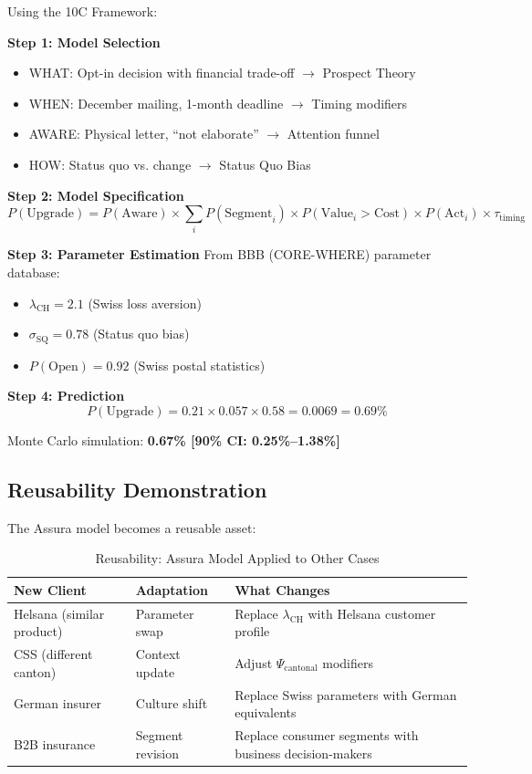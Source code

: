 Using the 10C Framework:

\textbf{Step 1: Model Selection}
\begin{itemize}[nosep]
    \item WHAT: Opt-in decision with financial trade-off $\to$ Prospect Theory
    \item WHEN: December mailing, 1-month deadline $\to$ Timing modifiers
    \item AWARE: Physical letter, ``not elaborate'' $\to$ Attention funnel
    \item HOW: Status quo vs. change $\to$ Status Quo Bias
\end{itemize}

\textbf{Step 2: Model Specification}
\begin{equation}
P(\text{Upgrade}) = P(\text{Aware}) \times \sum_i P(\text{Segment}_i) \times P(\text{Value}_i > \text{Cost}) \times P(\text{Act}_i) \times \tau_{\text{timing}}
\end{equation}

\textbf{Step 3: Parameter Estimation}
From BBB (CORE-WHERE) parameter database:
\begin{itemize}[nosep]
    \item $\lambda_{\text{CH}} = 2.1$ (Swiss loss aversion)
    \item $\sigma_{\text{SQ}} = 0.78$ (Status quo bias)
    \item $P(\text{Open}) = 0.92$ (Swiss postal statistics)
\end{itemize}

\textbf{Step 4: Prediction}
\begin{equation}
P(\text{Upgrade}) = 0.21 \times 0.057 \times 0.58 = 0.0069 = 0.69\%
\end{equation}

Monte Carlo simulation: \textbf{0.67\% [90\% CI: 0.25\%--1.38\%]}

\subsection{Reusability Demonstration}

The Assura model becomes a reusable asset:

\begin{table}[htbp]
\centering
\caption{Reusability: Assura Model Applied to Other Cases}
\label{tab:fm-reusability}
\renewcommand{\arraystretch}{1.3}
\begin{tabular}{@{}p{3.5cm}p{3cm}p{6cm}@{}}
\toprule
\textbf{New Client} & \textbf{Adaptation} & \textbf{What Changes} \\
\midrule
Helsana (similar product) & Parameter swap & Replace $\lambda_{\text{CH}}$ with Helsana customer profile \\
CSS (different canton) & Context update & Adjust $\Psi_{\text{cantonal}}$ modifiers \\
German insurer & Culture shift & Replace Swiss parameters with German equivalents \\
B2B insurance & Segment revision & Replace consumer segments with business decision-makers \\
\bottomrule
\end{tabular}
\end{table}

